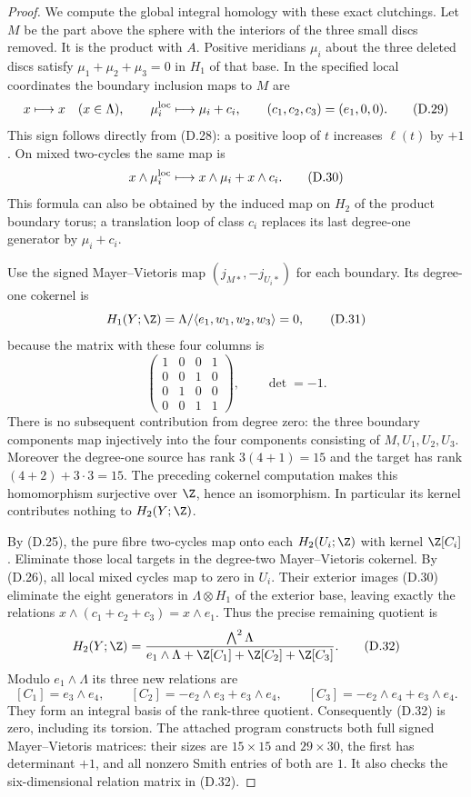 \begin{proof}
We compute the global integral homology with these exact
clutchings. Let $M$ be the part above the sphere with the
interiors of the three small discs removed. It is the
product with $A$. Positive meridians $\mu_i$ about the
three deleted discs satisfy
$\mu_1+\mu_2+\mu_3=0$ in $H_1$ of that base. In the
specified local coordinates the boundary inclusion maps
to $M$ are
\[
 x\longmapsto x\quad(x\in\Lambda),\qquad
 \mu_i^{\rm loc}\longmapsto\mu_i+c_i,
 \qquad(c_1,c_2,c_3)=(e_1,0,0).
\tag{D.29}
\]
This sign follows directly from (D.28): a positive loop
of $t$ increases $\ell(t)$ by $+1$. On mixed
two-cycles the same map is
\[
 x\wedge\mu_i^{\rm loc}
       \longmapsto x\wedge\mu_i+x\wedge c_i.
\tag{D.30}
\]
This formula can also be obtained by the induced map on
$H_2$ of the product boundary torus; a translation loop
of class $c_i$ replaces its last degree-one generator
by $\mu_i+c_i$.

Use the signed Mayer--Vietoris map
$(j_{M*},-j_{U_i*})$ for each boundary. Its degree-one
cokernel is
\[
 H_1(Y;\Z)=
 \Lambda/\langle e_1,w_1,w_2,w_3\rangle=0,
\tag{D.31}
\]
because the matrix with these four columns is
\[
 \begin{pmatrix}
 1&0&0&1\\0&0&1&0\\0&1&0&0\\0&0&1&1
 \end{pmatrix},\qquad\det=-1.
\]
There is no subsequent contribution from degree zero:
the three boundary components map injectively into the
four components consisting of $M,U_1,U_2,U_3$.
Moreover the degree-one source has rank $3(4+1)=15$
and the target has rank $(4+2)+3\cdot3=15$.
The preceding cokernel computation makes this homomorphism
surjective over $\Z$, hence an isomorphism. In particular
its kernel contributes nothing to $H_2(Y;\Z)$.

By (D.25), the pure fibre two-cycles map onto each
$H_2(U_i;\Z)$ with kernel $\Z[C_i]$. Eliminate those
local targets in the degree-two Mayer--Vietoris cokernel.
By (D.26), all local mixed cycles map to zero in $U_i$.
Their exterior images (D.30) eliminate the eight
generators in $\Lambda\otimes H_1$ of the exterior base,
leaving exactly the relations
$x\wedge(c_1+c_2+c_3)=x\wedge e_1$. Thus the precise
remaining quotient is
\[
 H_2(Y;\Z)=
 \frac{\bigwedge^2\Lambda}
 {e_1\wedge\Lambda+\Z[C_1]+\Z[C_2]+\Z[C_3]}.
\tag{D.32}
\]
Modulo $e_1\wedge\Lambda$ its three new relations are
\[
 [C_1]=e_3\wedge e_4,\qquad
 [C_2]=-e_2\wedge e_3+e_3\wedge e_4,\qquad
 [C_3]=-e_2\wedge e_4+e_3\wedge e_4.
\]
They form an integral basis of the rank-three quotient.
Consequently (D.32) is zero, including its torsion.
The attached program constructs both full signed
Mayer--Vietoris matrices: their sizes are $15\times15$
and $29\times30$, the first has determinant $+1$, and
all nonzero Smith entries of both are $1$. It also checks
the six-dimensional relation matrix in (D.32).


\end{proof}
